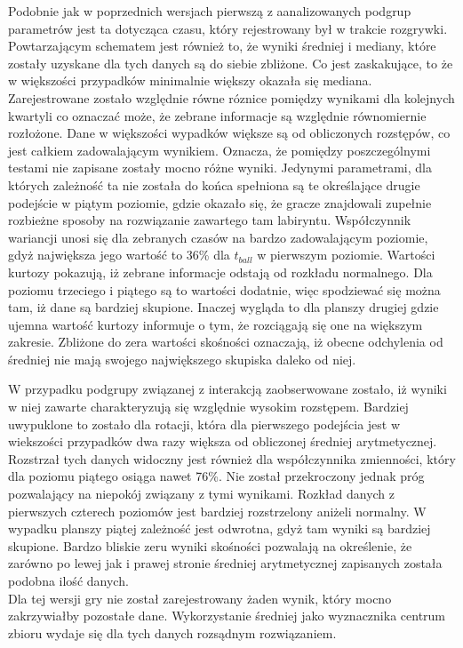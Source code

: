 \documentclass[a4paper,12pt,numbers=noenddot]{report}
\begin{document}
Podobnie jak w poprzednich wersjach pierwszą z aanalizowanych podgrup parametrów jest ta dotycząca czasu, który rejestrowany był w trakcie rozgrywki. Powtarzającym schematem jest również to, że wyniki średniej i mediany, które zostały uzyskane dla tych danych są do siebie zbliżone. Co jest zaskakujące, to że w większości przypadków minimalnie większy okazała się mediana. Zarejestrowane zostało względnie równe róznice pomiędzy wynikami dla kolejnych kwartyli co oznaczać może, że zebrane informacje są względnie równomiernie rozłożone. Dane w większości wypadków większe są od obliczonych rozstępów, co jest całkiem zadowalającym wynikiem. Oznacza, że pomiędzy poszczególnymi testami nie zapisane zostały mocno różne wyniki. Jedynymi parametrami, dla których zależność ta nie została do końca spełniona są te określające drugie podejście w piątym poziomie, gdzie okazało się, że gracze znajdowali zupełnie rozbieżne sposoby na rozwiązanie zawartego tam labiryntu. Współczynnik wariancji unosi się dla zebranych czasów na bardzo zadowalającym poziomie, gdyż największa jego wartość to 36\% dla $t_{ball}$ w pierwszym poziomie. Wartości kurtozy pokazują, iż zebrane informacje odstają od rozkładu normalnego. Dla poziomu trzeciego i piątego są to wartości dodatnie, więc spodziewać się można tam, iż dane są bardziej skupione. Inaczej wygląda to dla planszy drugiej gdzie ujemna wartość kurtozy informuje o tym, że rozciągają się one na większym zakresie. Zbliżone do zera wartości skośności oznaczają, iż obecne odchylenia od średniej nie mają swojego największego skupiska daleko od niej.

W przypadku podgrupy związanej z interakcją zaobserwowane zostało, iż wyniki w niej zawarte charakteryzują się względnie wysokim rozstępem. Bardziej uwypuklone to zostało dla rotacji, która dla pierwszego podejścia jest w wiekszości przypadków dwa razy większa od obliczonej średniej arytmetycznej. Rozstrzał tych danych widoczny jest również dla współczynnika zmienności, który dla poziomu piątego osiąga nawet 76\%. Nie został przekroczony jednak próg pozwalający na niepokój związany z tymi wynikami. Rozkład danych z pierwszych czterech poziomów jest bardziej rozstrzelony aniżeli normalny. W wypadku planszy piątej zależność jest odwrotna, gdyż tam wyniki są bardziej skupione. Bardzo bliskie zeru wyniki skośności pozwalają na określenie, że zarówno po lewej jak i prawej stronie średniej arytmetycznej zapisanych została podobna ilość danych.\\

Dla tej wersji gry nie został zarejestrowany żaden wynik, który mocno zakrzywiałby pozostałe dane. Wykorzystanie średniej jako wyznacznika centrum zbioru wydaje się dla tych danych rozsądnym rozwiązaniem.
\end{document}
